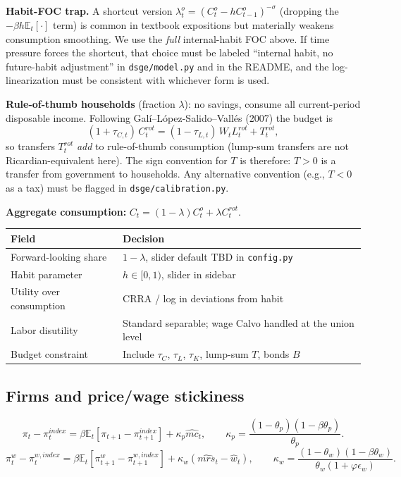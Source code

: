 \documentclass[11pt]{article}
\begin{document}
\begin{notebox}
\textbf{Habit-FOC trap.} A shortcut version $\lambda_t^o = (C_t^o - hC_{t-1}^o)^{-\sigma}$ (dropping the $-\beta h \mathbb{E}_t[\cdot]$ term) is common in textbook expositions but materially weakens consumption smoothing. We use the \emph{full} internal-habit FOC above. If time pressure forces the shortcut, that choice must be labeled ``internal habit, no future-habit adjustment'' in \texttt{dsge/model.py} and in the README, and the log-linearization must be consistent with whichever form is used.
\end{notebox}

\textbf{Rule-of-thumb households} (fraction $\lambda$): no savings, consume all current-period disposable income. Following Gal\'i--L\'opez-Salido--Vall\'es (2007) the budget is
\[
(1+\tau_{C,t})\, C_t^{rot} = (1-\tau_{L,t})\, W_t L_t^{rot} + T_t^{rot},
\]
so transfers $T_t^{rot}$ \emph{add} to rule-of-thumb consumption (lump-sum transfers are not Ricardian-equivalent here). The sign convention for $T$ is therefore: $T>0$ is a transfer from government to households. Any alternative convention (e.g., $T<0$ as a tax) must be flagged in \texttt{dsge/calibration.py}.

\textbf{Aggregate consumption:} $C_t = (1-\lambda) C_t^o + \lambda C_t^{rot}$.

\begin{tabularx}{\linewidth}{@{}p{3.1cm}X@{}}
\toprule
\textbf{Field} & \textbf{Decision} \\
\midrule
Forward-looking share & $1-\lambda$, slider default TBD in \texttt{config.py} \\
Habit parameter & $h \in [0,1)$, slider in sidebar \\
Utility over consumption & CRRA / log in deviations from habit \\
Labor disutility & Standard separable; wage Calvo handled at the union level \\
Budget constraint & Include $\tau_C$, $\tau_L$, $\tau_K$, lump-sum $T$, bonds $B$ \\
\bottomrule
\end{tabularx}

\subsection{Firms and price/wage stickiness}
\[
\pi_t - \pi_t^{index} = \beta \mathbb{E}_t[\pi_{t+1} - \pi_{t+1}^{index}] + \kappa_p \widehat{mc}_t, \qquad
\kappa_p = \frac{(1-\theta_p)(1-\beta \theta_p)}{\theta_p}.
\]
\[
\pi_t^w - \pi_t^{w,index} = \beta \mathbb{E}_t[\pi_{t+1}^w - \pi_{t+1}^{w,index}] + \kappa_w (\widehat{mrs}_t - \widehat{w}_t), \qquad
\kappa_w = \frac{(1-\theta_w)(1-\beta \theta_w)}{\theta_w (1+\varphi \epsilon_w)}.
\]
\end{document}
